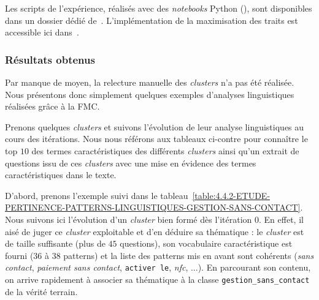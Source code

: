 			\begin{leftBarInformation}
				Les scripts de l'expérience, réalisés avec des \textit{notebooks} Python (\cite{van-rossum-drake:2009:python-reference-manual}), sont disponibles dans un dossier dédié de~\cite{schild:2021:cognitivefactory-interactiveclusteringcomparativestudy}.
				L'implémentation de la maximisation des traits est accessible ici dans~\cite{schild:2023:cognitivefactory-featuresmaximizationmetric}.
			\end{leftBarInformation}

		\subsubsection{Résultats obtenus}
			
			\begin{leftBarWarning}
				Par manque de moyen, la relecture manuelle des \textit{clusters} n'a pas été réalisée.
				Nous présentons donc simplement quelques exemples d'analyses linguistiques réalisées grâce à la FMC.
			\end{leftBarWarning}
			
			Prenons quelques \textit{clusters} et suivons l'évolution de leur analyse linguistiques au cours des itérations.
			Nous nous référons aux tableaux ci-contre pour connaître le top $10$ des termes caractéristiques des différents \textit{clusters} ainsi qu'un extrait de questions issu de ces \textit{clusters} avec une mise en évidence des termes caractéristiques dans le texte.
			
			D'abord, prenons l'exemple suivi dans le tableau~\ref{table:4.4.2-ETUDE-PERTINENCE-PATTERNS-LINGUISTIQUES-GESTION-SANS-CONTACT}.
			Nous suivons ici l'évolution d'un \textit{cluster} bien formé dès l'itération $0$.
			En effet, il aisé de juger ce \textit{cluster} exploitable et d'en déduire sa thématique : le \textit{cluster} est de taille suffisante (plus de $45$ questions), son vocabulaire caractéristique est fourni ($36$ à $38$ patterns) et la liste des patterns mis en avant sont cohérents (\textit{sans contact}, \textit{paiement sans contact}, \texttt{activer le}, \textit{nfc}, ...).
			En parcourant son contenu, on arrive rapidement à associer sa thématique à la classe \texttt{gestion\_sans\_contact} de la vérité terrain.
			
